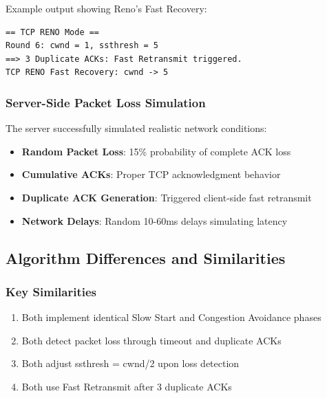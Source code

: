 \documentclass[12pt]{article}
\begin{document}
Example output showing Reno's Fast Recovery:
\begin{verbatim}
== TCP RENO Mode ==
Round 6: cwnd = 1, ssthresh = 5
==> 3 Duplicate ACKs: Fast Retransmit triggered.
TCP RENO Fast Recovery: cwnd -> 5
\end{verbatim}

\subsubsection{Server-Side Packet Loss Simulation}

The server successfully simulated realistic network conditions:

\begin{itemize}
    \item \textbf{Random Packet Loss}: 15\% probability of complete ACK loss
    \item \textbf{Cumulative ACKs}: Proper TCP acknowledgment behavior
    \item \textbf{Duplicate ACK Generation}: Triggered client-side fast retransmit
    \item \textbf{Network Delays}: Random 10-60ms delays simulating latency
\end{itemize}

\subsection{Algorithm Differences and Similarities}

\subsubsection{Key Similarities}
\begin{enumerate}
    \item Both implement identical Slow Start and Congestion Avoidance phases
    \item Both detect packet loss through timeout and duplicate ACKs
    \item Both adjust ssthresh = cwnd/2 upon loss detection
    \item Both use Fast Retransmit after 3 duplicate ACKs
\end{enumerate}
\end{document}
